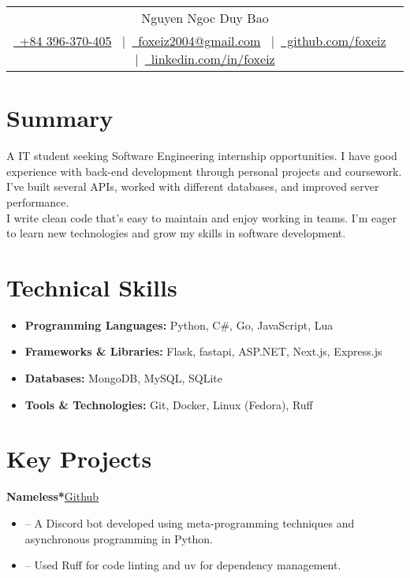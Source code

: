 \documentclass[a4paper,12pt]{article}
\newenvironment{itemList}[3][]
    {
    \noindent\hspace{1em}\textbf{#2}\hfill#3\\[3.75pt]
    \begin{minipage}[t]{\linewidth}
    \begin{itemize}[nosep,after=\strut, leftmargin=2em, itemsep=3pt,label={},#1]
    }
    {
    \end{itemize}
    \end{minipage}
    }
\begin{document}
\pagestyle{empty}

\begin{tabularx}{\linewidth}{@{} C @{}}
    \Huge{Nguyen Ngoc Duy Bao} \\[7.5pt]
    \href{tel:+84396370405}{\raisebox{-0.05\height}\ +84 396-370-405} \ $|$\
    \href{mailto:foxeiz2004@gmail.com}{\raisebox{-0.05\height}\ foxeiz2004@gmail.com} \ $|$\
    \href{https://github.com/foxeiz}{\raisebox{-0.05\height}\ github.com/foxeiz} \ $|$\
    \href{https://linkedin.com/in/foxeiz}{\raisebox{-0.05\height}\ linkedin.com/in/foxeiz}
\end{tabularx}

\section{Summary}
A IT student seeking Software Engineering internship opportunities. I have good experience with back-end development through personal projects and coursework. I've built several APIs, worked with different databases, and improved server performance. \\
I write clean code that's easy to maintain and enjoy working in teams. I'm eager to learn new technologies and grow my skills in software development.

\section{Technical Skills}
\begin{itemize}[nosep,after=\strut, leftmargin=1em, itemsep=4pt, label={}]
    \item \textbf{Programming Languages:} Python, C\#, Go, JavaScript, Lua
    \item \textbf{Frameworks \& Libraries:} Flask, fastapi, ASP.NET, Next.js, Express.js
    \item \textbf{Databases:} MongoDB, MySQL, SQLite
    \item \textbf{Tools \& Technologies:} Git, Docker, Linux (Fedora), Ruff
\end{itemize}

\section{Key Projects}

\begin{itemList}{Nameless*}{\href{https://github.com/team-nameless/nameless-discord-bot/}{Github}}
    \item -- A Discord bot developed using meta-programming techniques and asynchronous programming in Python.
    \item -- Used Ruff for code linting and uv for dependency management.
\end{itemList}
\end{document}
